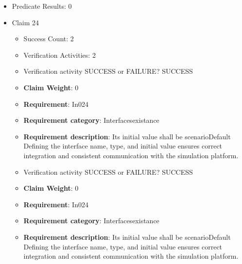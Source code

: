 \documentclass{article}
\begin{document}
\begin{itemize}
\begin{itemize}
					\item Verification activity SUCCESS or FAILURE? SUCCESS
					\item \textbf{Claim Weight}: 0
						\item \textbf{Requirement}: In023 
						\item \textbf{Requirement category}: Interfacesexistance 
						\item \textbf{Requirement description}: Its initial value shall be set to 0 Defining the interface name, type, and initial value ensures correct integration and consistent communication with the simulation platform.
					
				\end{itemize}
				
									    
				\item Predicate Results: 0

  				  \item Claim 24
				\begin{itemize}
			    	\item Success Count: 2 
			    	\item Verification Activities: 2
					\item Verification activity SUCCESS or FAILURE? SUCCESS
					\item \textbf{Claim Weight}: 0
						\item \textbf{Requirement}: In024 
						\item \textbf{Requirement category}: Interfacesexistance 
						\item \textbf{Requirement description}: Its initial value shall be scenarioDefault Defining the interface name, type, and initial value ensures correct integration and consistent communication with the simulation platform.
					
					\item Verification activity SUCCESS or FAILURE? SUCCESS
					\item \textbf{Claim Weight}: 0
						\item \textbf{Requirement}: In024 
						\item \textbf{Requirement category}: Interfacesexistance 
						\item \textbf{Requirement description}: Its initial value shall be scenarioDefault Defining the interface name, type, and initial value ensures correct integration and consistent communication with the simulation platform.
					
				\end{itemize}
				

\end{itemize}
\end{document}
